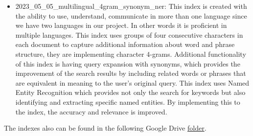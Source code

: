 \begin{itemize}
	\item 2023\_05\_05\_multilingual\_4gram\_synonym\_ner: This index is created with the ability to use, understand, communicate in more than one language since we have two languages in our project. In other words it is proficient in multiple languages. This index uses groups of four consecutive characters in each document to capture additional information about word and phrase structure, they are implementing character 4-grams. Additional functionality of this index is having query expansion with synonyms, which provides the improvement of the search results by including related words or phrases that are equivalent in meaning to the user's original query. This index uses Named Entity Recognition which provides not only the search for keywords but also identifying and extracting specific named entities. By implementing this to the index, the accuracy and relevance is improved.
\end{itemize}
The indexes also can be found in the following Google Drive \href{https://drive.google.com/drive/folders/1CK_kLeZ5Us3VJe8hiG1vhwPrDs94cLvU?usp=share_link}{folder}.